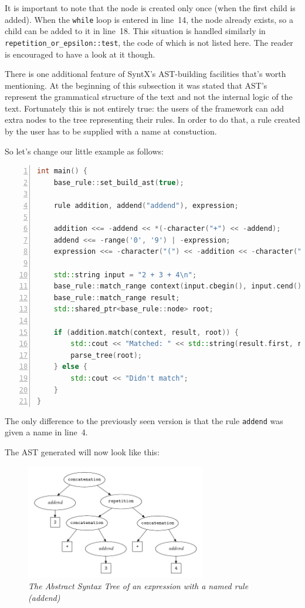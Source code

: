 \documentclass[12pt]{article}
\begin{document}
It is important to note that the node is created only once (when the first child is added). When the
\texttt{while} loop is entered in line~14, the node already exists, so a child can be added to it in line~18.
This situation is handled similarly in \texttt{repetition\_or\_epsilon::test}, the code of which is not listed
here. The reader is encouraged to have a look at it though.

There is one additional feature of SyntX's AST-building facilities that's worth mentioning. At the beginning
of this subsection it was stated that AST's represent the grammatical structure of the text and not the
internal logic of the text. Fortunately this is not entirely true: the users of the framework can add extra
nodes to the tree representing their rules. In order to do that, a rule created by the user has to be supplied
with a name at constuction.

So let's change our little example as follows:

\begin{center}
	\begin{minipage}[ht]{0.7\textwidth}
		\begin{lstlisting}[language=C++, breaklines=true, numbers=left]
int main() {
	base_rule::set_build_ast(true);

	rule addition, addend("addend"), expression;

	addition <<= -addend << *(-character("+") << -addend);
	addend <<= -range('0', '9') | -expression;
	expression <<= -character("(") << -addition << -character(")");

	std::string input = "2 + 3 + 4\n";
	base_rule::match_range context(input.cbegin(), input.cend());
	base_rule::match_range result;
	std::shared_ptr<base_rule::node> root;

	if (addition.match(context, result, root)) {
		std::cout << "Matched: " << std::string(result.first, result.second);
		parse_tree(root);
	} else {
		std::cout << "Didn't match";
	}
}
		\end{lstlisting}
	\end{minipage}
\end{center}

The only difference to the previously seen version is that the rule \texttt{addend} was given a name in
line~4.

The AST generated will now look like this:

\begin{figure}[h!]
	\centering
		\includegraphics[width=0.7\textwidth]{ast_named_rule}
		\caption{\emph{The Abstract Syntax Tree of an expression with a named rule (addend)}}
		\label{fig:ast}
\end{figure}
\end{document}
